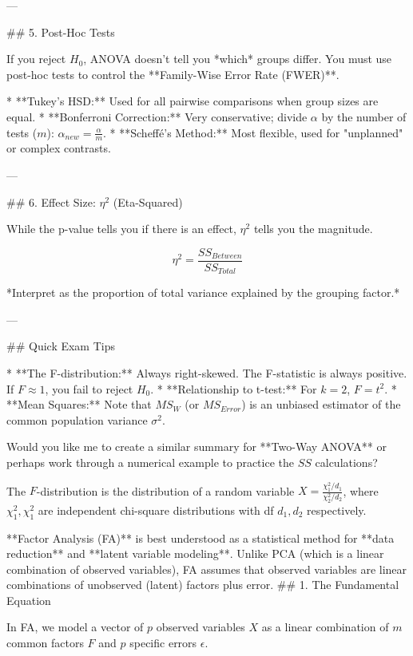 ---

## 5. Post-Hoc Tests

If you reject \( H_0 \), ANOVA doesn't tell you *which* groups differ. You must use post-hoc tests to control the **Family-Wise Error Rate (FWER)**.

* **Tukey’s HSD:** Used for all pairwise comparisons when group sizes are equal.
* **Bonferroni Correction:** Very conservative; divide \( \alpha \) by the number of tests (\( m \)): \( \alpha_{new} = \frac{\alpha}{m} \).
* **Scheffé’s Method:** Most flexible, used for "unplanned" or complex contrasts.

---

## 6. Effect Size: \( \eta^2 \) (Eta-Squared)

While the p-value tells you if there is an effect, \( \eta^2 \) tells you the magnitude.


\[ \eta^2 = \frac{SS_{Between}}{SS_{Total}} \]


*Interpret as the proportion of total variance explained by the grouping factor.*

---

## Quick Exam Tips

* **The F-distribution:** Always right-skewed. The F-statistic is always positive. If \( F \approx 1 \), you fail to reject \( H_0 \).
* **Relationship to t-test:** For \( k=2 \), \( F = t^2 \).
* **Mean Squares:** Note that \( MS_W \) (or \( MS_{Error} \)) is an unbiased estimator of the common population variance \( \sigma^2 \).

Would you like me to create a similar summary for **Two-Way ANOVA** or perhaps work through a numerical example to practice the \( SS \) calculations?

The \( F \)-distribution is the distribution of a random variable
\( X = \frac{\chi^2_1 / d_1}{\chi^2_2 / d_2} \), where \( \chi^2_{1}, \chi^2_{1} \) are independent chi-square distributions with df \( d_1, d_2 \) respectively.



**Factor Analysis (FA)** is best understood as a statistical method for **data reduction** and **latent variable modeling**. 
Unlike PCA (which is a linear combination of observed variables), FA assumes that observed variables are linear combinations of unobserved (latent) factors plus error.
## 1. The Fundamental Equation

In FA, we model a vector of \( p \) observed variables \( X \) as a linear combination of \( m \) common factors \( F \) and \( p \) specific errors \( \epsilon \).

